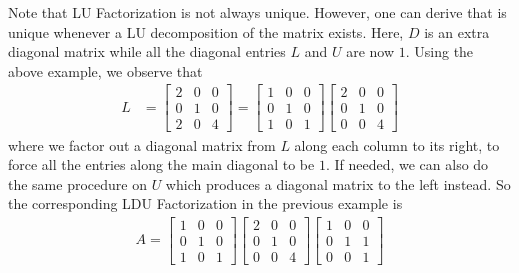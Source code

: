 Note that LU Factorization is not always unique. However, one can derive  that is unique whenever a LU decomposition of the matrix exists. Here, $D$ is an extra diagonal matrix while all the diagonal entries $L$ and $U$ are now $1$. Using the above example, we observe that
\begin{align*}
L &=
\begin{bmatrix}
2 & 0 & 0 \\
0 & 1 & 0 \\
2 & 0 & 4
\end{bmatrix} = 
\begin{bmatrix}
1 & 0 & 0 \\
0 & 1 & 0 \\
1 & 0 & 1
\end{bmatrix}
\begin{bmatrix}
2 & 0 & 0 \\
0 & 1 & 0 \\
0 & 0 & 4
\end{bmatrix}
\end{align*}
where we factor out a diagonal matrix from $L$ along each column to its right, to force all the entries along the main diagonal to be $1$. If needed, we can also do the same procedure on $U$ which produces a diagonal matrix to the left instead. So the corresponding LDU Factorization in the previous example is
\begin{align*}
A =
\begin{bmatrix}
1 & 0 & 0 \\
0 & 1 & 0 \\
1 & 0 & 1
\end{bmatrix}
\begin{bmatrix}
2 & 0 & 0 \\
0 & 1 & 0 \\
0 & 0 & 4
\end{bmatrix}
\begin{bmatrix}
1 & 0 & 0 \\
0 & 1 & 1 \\
0 & 0 & 1 
\end{bmatrix}
\end{align*}

